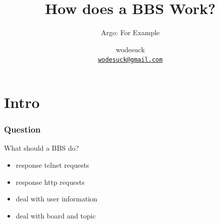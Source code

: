 \documentclass[slidestop,compress,mathserif]{beamer}
\title{How does a BBS Work?}
\subtitle{Argo: For Example}
\author[wodesuck]
{ wodesuck\\ \href{mailto:wodesuck@gmail.com}{{\tt wodesuck@gmail.com}} }
\institute[ Argolab\\ Sun Yat-sen University ]
{ Argolab\\ Sun Yat-sen University }
\begin{document}
  {\aauwavesbg
  \begin{frame}
    \titlepage
  \end{frame}}

  \section{Intro}
  \begin{frame}
    \frametitle{Question}
    \begin{block}{What should a BBS do?}
      \begin{itemize}
        \item response telnet requests
        \item response http requests
        \item deal with user information
        \item deal with board and topic
      \end{itemize}
    \end{block}
  \end{frame}
\end{document}
